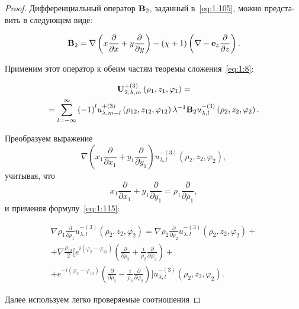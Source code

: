 \begin{russian}
\begin{proof}
Дифференциальный оператор ${{\bf{B}}_2}$, заданный в~\eqref{eq:1:105}, можно представить в следующем виде:

\begin{equation}\label{eq:1:116}
{{\bf{B}}_2} = \nabla \left( {x\frac{\partial }{{\partial x}} + y\frac{\partial }{{\partial y}}} \right) - \left( {\chi  + 1} \right)\left( {\nabla  - {{\bf{e}}_z}\frac{\partial }{{\partial z}}} \right).
\end{equation}

Применим этот оператор к обеим частям теоремы сложения~\eqref{eq:1:8}:

\begin{multline}\label{eq:1:117}
{\bf{U}}_{2,\lambda ,m}^{ + (3)}\left( {{\rho _1},{z_1},{\varphi _1}} \right) = \\
= \sum\limits_{l =  - \infty }^\infty  {{{( - 1)}^l}} u_{\lambda ,m - l}^{ + (3)}\left( {{\rho _{12}},{z_{12}},{\varphi _{12}}} \right){\lambda ^{ - 1}}{{\bf{B}}_2}u_{\lambda ,l}^{ - (3)}\left( {{\rho _2},{z_2},{\varphi _2}} \right).
\end{multline}

Преобразуем выражение
$$\nabla \left( {{x_1}\frac{\partial }{{\partial {x_1}}} + {y_1}\frac{\partial }{{\partial {y_1}}}} \right)u_{\lambda ,l}^{ - (3)}\left( {{\rho _2},{z_2},{\varphi _2}} \right),$$
учитывая, что
$${x_1}\frac{\partial }{{\partial {x_1}}} + {y_1}\frac{\partial }{{\partial {y_1}}} = {\rho _1}\frac{\partial }{{\partial {\rho _1}}},$$ и применяя формулу~\eqref{eq:1:115}:

\begin{multline}\label{eq:1:118}
\nabla {\rho _1}\frac{\partial }{{\partial {\rho _1}}}u_{\lambda ,l}^{ - (3)}\left( {{\rho _2},{z_2},{\varphi _2}} \right) = \nabla {\rho _2}\frac{\partial }{{\partial {\rho _2}}}u_{\lambda ,l}^{ - (3)}\left( {{\rho _2},{z_2},{\varphi _2}} \right) + \\
+ \nabla \frac{{{\rho _{12}}}}{2}\bigg[ {{e^{i\left( {{\varphi _2} - {\varphi _{12}}} \right)}}}\left( {\frac{\partial }{{\partial {\rho _2}}} + \frac{i}{{{\rho _2}}}\frac{\partial }{{\partial {\varphi _2}}}} \right) + \\
+ {e^{ - i\left( {{\varphi _2} - {\varphi _{12}}} \right)}}\left( {\frac{\partial }{{\partial {\rho _2}}} - \frac{i}{{{\rho _2}}}\frac{\partial }{{\partial {\varphi _2}}}} \right)\bigg]u_{\lambda ,l}^{ - (3)}\left( {{\rho _2},{z_2},{\varphi _2}} \right).
\end{multline}

Далее используем легко проверяемые соотношения


\end{proof}
\end{russian}
